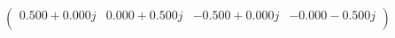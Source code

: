 \documentclass[border=1em]{standalone}
\begin{document}
$
\left(
\begin{array}{cccc}
0.500+0.000j & 0.000+0.500j & -0.500+0.000j & -0.000-0.500j \\
\end{array}
\right)
$
\end{document}
